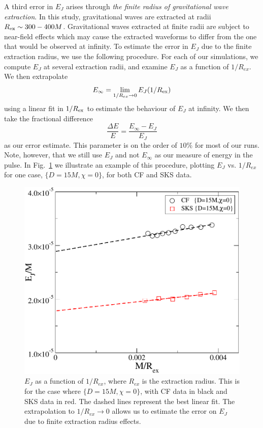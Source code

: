 A third error in $E_J$ arises through {\it the finite radius
    of gravitational wave extraction}.  In this study, gravitational waves are extracted at radii $R_{\rm ex}\sim 300-400M$.  Gravitational waves extracted at finite radii are subject to near-field effects which may cause the extracted
waveforms to differ from the one that would be observed at
infinity.  
To estimate the error in $E_J$ due to the finite extraction radius, we
use the following procedure. For each of our simulations, we compute $E_J$ at
several extraction radii, and examine $E_J$ as a function of
$1/R_{ex}$. We then extrapolate
\begin{equation}
E_{\infty} = \lim_{1/R_{ex}\rightarrow 0}E_J(1/R_{\rm ex})
\end{equation}
using a linear fit in $1/R_{\rm ex}$ to estimate the behaviour of $E_J$ at infinity. We
then take the fractional difference
\begin{equation}
\frac{\Delta E}{E} = \frac{E_{\infty}-E_J}{E_J}
\end{equation}
as our error estimate. This parameter is on the order of $10\%$ for
most of our runs. Note, however, that we still use $E_J$ and not $E_{\infty}$ as
our measure of energy in the pulse. In Fig.~\ref{fig:EvsRextr} we illustrate an
example of this procedure, plotting $E_J$ vs. $1/R_{ex}$ for one case,
$\{D=15M, \chi=0\}$, for both CF and SKS data.

\begin{figure}
  \includegraphics[scale=0.95]{chap5/EvsRextr}
  \caption[$E_J$ as a function of $1_R/{\rm ex}$.]{$E_J$ as a function of $1/R_{ex}$, where $R_{ex}$ is the
    extraction radius. This is for the case where $\{D=15M,\chi=0\}$,
    with CF data in black and SKS data in red. The dashed lines
    represent the best linear fit. The extrapolation
    to $1/R_{ex}\rightarrow 0$ allows us to estimate the error on
    $E_J$ due to finite extraction radius effects. }

  \label{fig:EvsRextr}
\end{figure}

